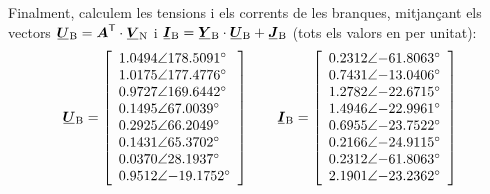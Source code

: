 \begin{exemple}
    Finalment, calculem les tensions i els corrents de les branques,
    mitjançant els vectors $\mcmplx{U}\ped{B} = \transpose{\boldsymbol{A}} \cdot \mcmplx{V}\ped{N}$ i $\mcmplx{I}\ped{B} =  \mcmplx{Y}\ped{B} \cdot
    \mcmplx{U}\ped{B} + \mcmplx{J}\ped{B}$ (tots els valors en per unitat):
    \[
       \mcmplx{U}\ped{B} =
       \begin{bmatrix}\begin{array}{l}
         \complexnum{1,0494:178,5091} \\
         \complexnum{1,0175:177,4776} \\
         \complexnum{0,9727: 169,6442} \\
         \complexnum{0,1495:  67,0039} \\
         \complexnum{0,2925:  66,2049} \\
         \complexnum{0,1431:  65,3702} \\
         \complexnum{0,0370:  28,1937} \\
         \complexnum{0,9512: -19,1752}
       \end{array}\end{bmatrix}
       \qquad
       \mcmplx{I}\ped{B} =
       \begin{bmatrix}\begin{array}{l}
         \complexnum{0,2312:-61,8063} \\
         \complexnum{0,7431:-13,0406} \\
         \complexnum{1,2782:-22,6715} \\
         \complexnum{1,4946:-22,9961} \\
         \complexnum{0,6955:-23,7522} \\
         \complexnum{0,2166:-24,9115} \\
         \complexnum{0,2312:-61,8063} \\
         \complexnum{2,1901:-23,2362}
       \end{array}\end{bmatrix}
    \]


\end{exemple}
